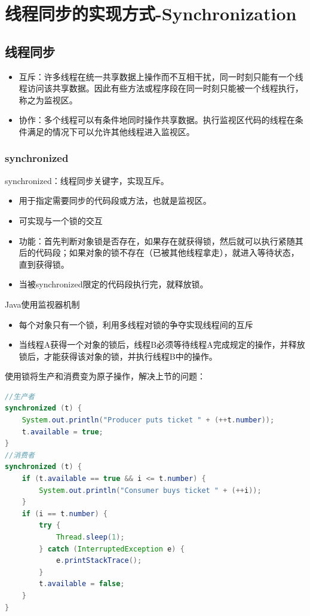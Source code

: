 \section{线程同步的实现方式-Synchronization}
\subsection{线程同步}
\begin{itemize}
	\item 互斥：许多线程在统一共享数据上操作而不互相干扰，同一时刻只能有一个线程访问该共享数据。因此有些方法或程序段在同一时刻只能被一个线程执行，称之为监视区。
	\item 协作：多个线程可以有条件地同时操作共享数据。执行监视区代码的线程在条件满足的情况下可以允许其他线程进入监视区。
\end{itemize}
\subsubsection{synchronized}
synchronized：线程同步关键字，实现互斥。
\begin{itemize}
	\item 用于指定需要同步的代码段或方法，也就是监视区。
	\item 可实现与一个锁的交互
	\item 功能：首先判断对象锁是否存在，如果存在就获得锁，然后就可以执行紧随其后的代码段；如果对象的锁不存在（已被其他线程拿走），就进入等待状态，直到获得锁。
	\item 当被synchronized限定的代码段执行完，就释放锁。
\end{itemize}
Java使用监视器机制
\begin{itemize}
	\item 每个对象只有一个锁，利用多线程对锁的争夺实现线程间的互斥
	\item 当线程A获得一个对象的锁后，线程B必须等待线程A完成规定的操作，并释放锁后，才能获得该对象的锁，并执行线程B中的操作。
\end{itemize}
使用锁将生产和消费变为原子操作，解决上节的问题：
\begin{lstlisting}[language=java]
//生产者
synchronized (t) {
	System.out.println("Producer puts ticket " + (++t.number));
	t.available = true;
}
//消费者
synchronized (t) {
	if (t.available == true && i <= t.number) {
		System.out.println("Consumer buys ticket " + (++i));
	}
	if (i == t.number) {
		try {
			Thread.sleep(1);
		} catch (InterruptedException e) {
			e.printStackTrace();
		}
		t.available = false;
	}
}
\end{lstlisting}
